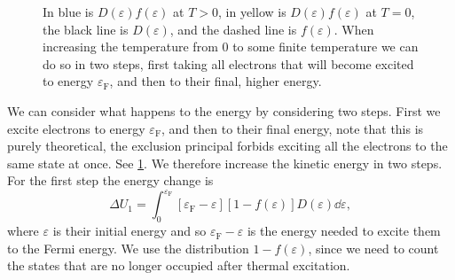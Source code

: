 \documentclass[fleqn]{NotesClass}
\newcommand*{\fermi}{\mathrm{F}}
\begin{document}
    \begin{figure}
        \caption{In blue is \(D(\varepsilon)f(\varepsilon)\) at \(T > 0\), in yellow is \(D(\varepsilon)f(\varepsilon)\) at \(T = 0\), the black line is \(D(\varepsilon)\), and the dashed line is \(f(\varepsilon)\). When increasing the temperature from \(0\) to some finite temperature we can do so in two steps, first taking all electrons that will become excited to energy \(\varepsilon_{\fermi}\), and then to their final, higher energy.}
        \label{fig:stepping electron energies}
    \end{figure}
    
    We can consider what happens to the energy by considering two steps.
    First we excite electrons to energy \(\varepsilon_{\fermi}\), and then to their final energy, note that this is purely theoretical, the exclusion principal forbids exciting all the electrons to the same state at once.
    See \cref{fig:stepping electron energies}.
    We therefore increase the kinetic energy in two steps.
    For the first step the energy change is
    \begin{equation}
        \Delta U_1 = \int_{0}^{\varepsilon_{\fermi}} [\varepsilon_{\fermi} - \varepsilon][1 - f(\varepsilon)]D(\varepsilon) \dd{\varepsilon},
    \end{equation}
    where \(\varepsilon\) is their initial energy and so \(\varepsilon_{\fermi} - \varepsilon\) is the energy needed to excite them to the Fermi energy.
    We use the distribution \(1 - f(\varepsilon)\), since we need to count the states that are no longer occupied after thermal excitation.
    
\end{document}
